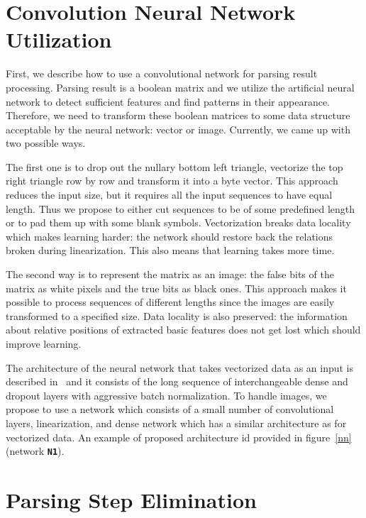 \section{Convolution Neural Network Utilization}

First, we describe how to use a convolutional network for parsing result processing. Parsing result is a boolean matrix and we utilize the artificial neural network to detect sufficient features and find patterns in their appearance.
Therefore, we need to transform these boolean matrices to some data structure acceptable by the neural network: vector or image.
Currently, we came up with two possible ways.

The first one is to drop out the nullary bottom left triangle, vectorize the top right triangle row by row and transform it into a byte vector.
This approach reduces the input size, but it requires all the input sequences to have equal length.
Thus we propose to either cut sequences to be of some predefined length or to pad them up with some blank symbols.
Vectorization breaks data locality which makes learning harder: the network should restore back the relations broken during linearization.
This also means that learning takes more time.

The second way is to represent the matrix as an image: the false bits of the matrix as white pixels and the true bits as black ones.
This approach makes it possible to process sequences of different lengths since the images are easily transformed to a specified size.
Data locality is also preserved: the information about relative positions of extracted basic features does not get lost which should improve learning.

The architecture of the neural network that takes vectorized data as an input is described in~\cite{grigorevcomposition} and it consists of the long sequence of interchangeable dense and dropout layers with aggressive batch normalization. 
To handle images, we propose to use a network which consists of a small number of convolutional layers, linearization, and dense network which has a similar architecture as for vectorized data.
An example of proposed architecture id provided in figure~\ref{nn} (network \textbf{\texttt{N1}}).

\section{Parsing Step Elimination}

